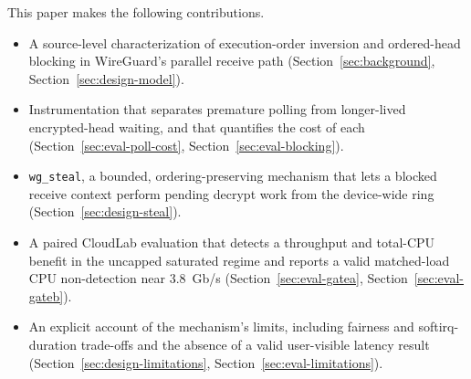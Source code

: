 This paper makes the following contributions.
\begin{itemize}
  \item A source-level characterization of execution-order inversion and
    ordered-head blocking in WireGuard's parallel receive path
    (Section~\ref{sec:background}, Section~\ref{sec:design-model}).
  \item Instrumentation that separates premature polling from longer-lived
    encrypted-head waiting, and that quantifies the cost of each
    (Section~\ref{sec:eval-poll-cost}, Section~\ref{sec:eval-blocking}).
  \item \texttt{wg\_steal}, a bounded, ordering-preserving mechanism that lets a
    blocked receive context perform pending decrypt work from the device-wide
    ring (Section~\ref{sec:design-steal}).
  \item A paired CloudLab evaluation that detects a throughput and total-CPU
    benefit in the uncapped saturated regime and reports a valid matched-load
    CPU non-detection near 3.8~Gb/s (Section~\ref{sec:eval-gatea},
    Section~\ref{sec:eval-gateb}).
  \item An explicit account of the mechanism's limits, including fairness and
    softirq-duration trade-offs and the absence of a valid user-visible latency
    result (Section~\ref{sec:design-limitations},
    Section~\ref{sec:eval-limitations}).
\end{itemize}
